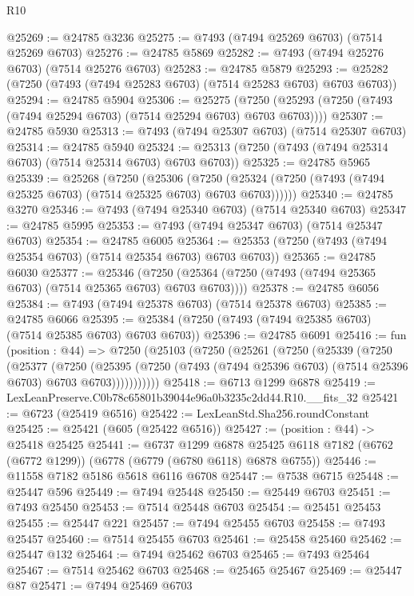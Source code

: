 \begin{lexlean}{R10}
\begin{coremodule}
@25269 := @24785 @3236
@25275 := @7493 (@7494 @25269 @6703) (@7514 @25269 @6703)
@25276 := @24785 @5869
@25282 := @7493 (@7494 @25276 @6703) (@7514 @25276 @6703)
@25283 := @24785 @5879
@25293 := @25282 (@7250 (@7493 (@7494 @25283 @6703) (@7514 @25283 @6703) @6703 @6703))
@25294 := @24785 @5904
@25306 := @25275
    (@7250 (@25293 (@7250 (@7493 (@7494 @25294 @6703) (@7514 @25294 @6703) @6703 @6703))))
@25307 := @24785 @5930
@25313 := @7493 (@7494 @25307 @6703) (@7514 @25307 @6703)
@25314 := @24785 @5940
@25324 := @25313 (@7250 (@7493 (@7494 @25314 @6703) (@7514 @25314 @6703) @6703 @6703))
@25325 := @24785 @5965
@25339 := @25268
    (@7250
      (@25306
        (@7250 (@25324 (@7250 (@7493 (@7494 @25325 @6703) (@7514 @25325 @6703) @6703 @6703))))))
@25340 := @24785 @3270
@25346 := @7493 (@7494 @25340 @6703) (@7514 @25340 @6703)
@25347 := @24785 @5995
@25353 := @7493 (@7494 @25347 @6703) (@7514 @25347 @6703)
@25354 := @24785 @6005
@25364 := @25353 (@7250 (@7493 (@7494 @25354 @6703) (@7514 @25354 @6703) @6703 @6703))
@25365 := @24785 @6030
@25377 := @25346
    (@7250 (@25364 (@7250 (@7493 (@7494 @25365 @6703) (@7514 @25365 @6703) @6703 @6703))))
@25378 := @24785 @6056
@25384 := @7493 (@7494 @25378 @6703) (@7514 @25378 @6703)
@25385 := @24785 @6066
@25395 := @25384 (@7250 (@7493 (@7494 @25385 @6703) (@7514 @25385 @6703) @6703 @6703))
@25396 := @24785 @6091
@25416 := fun (position : @44) =>
  @7250
    (@25103
      (@7250
        (@25261
          (@7250
            (@25339
              (@7250
                (@25377
                  (@7250
                    (@25395
                      (@7250 (@7493 (@7494 @25396 @6703) (@7514 @25396 @6703) @6703 @6703)))))))))))
@25418 := @6713 @1299 @6878
@25419 := LexLeanPreserve.C0b78c65801b39044e96a0b3235c2dd44.R10.__fits_32
@25421 := @6723 (@25419 @6516)
@25422 := LexLeanStd.Sha256.roundConstant
@25425 := @25421 (@605 (@25422 @6516))
@25427 := (position : @44) -> @25418 @25425
@25441 := @6737
    @1299
    @6878
    @25425
    @6118
    @7182
    (@6762 (@6772 @1299))
    (@6778 (@6779 (@6780 @6118) @6878 @6755))
@25446 := @11558 @7182 @5186 @5618 @6116 @6708
@25447 := @7538 @6715
@25448 := @25447 @596
@25449 := @7494 @25448
@25450 := @25449 @6703
@25451 := @7493 @25450
@25453 := @7514 @25448 @6703
@25454 := @25451 @25453
@25455 := @25447 @221
@25457 := @7494 @25455 @6703
@25458 := @7493 @25457
@25460 := @7514 @25455 @6703
@25461 := @25458 @25460
@25462 := @25447 @132
@25464 := @7494 @25462 @6703
@25465 := @7493 @25464
@25467 := @7514 @25462 @6703
@25468 := @25465 @25467
@25469 := @25447 @87
@25471 := @7494 @25469 @6703

\end{coremodule}
\end{lexlean}

